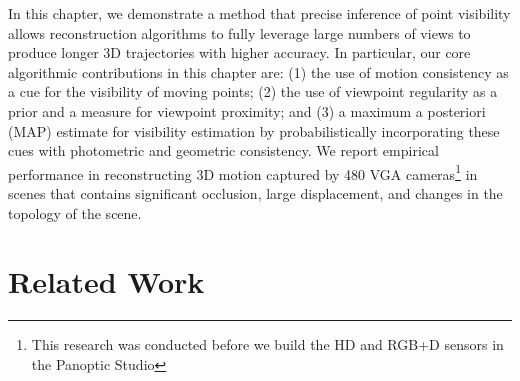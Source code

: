 

In this chapter, we demonstrate a method that precise inference of point visibility allows reconstruction algorithms to fully leverage large numbers of views to produce longer 3D trajectories with higher accuracy. In particular, our core algorithmic contributions in this chapter are: (1) the use of motion consistency as a cue for the visibility of moving points; (2) the use of viewpoint regularity as a prior and a measure for viewpoint proximity; and (3) a maximum a posteriori (MAP) estimate for visibility estimation by probabilistically incorporating these cues with photometric and geometric consistency. We report empirical performance in reconstructing 3D motion captured by 480 VGA cameras\footnote{This research was conducted before we build the HD and RGB+D sensors in the Panoptic Studio} in scenes that contains significant occlusion, large displacement, and changes in the topology of the scene.

\section{Related Work}

